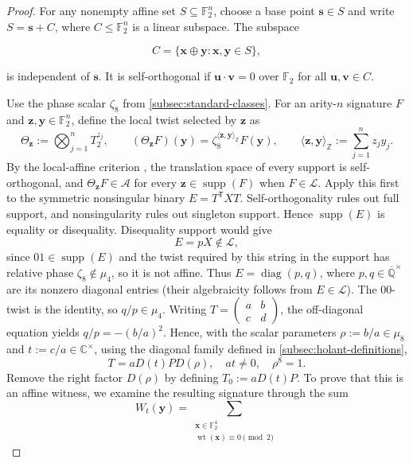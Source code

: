 \documentclass[11pt,letterpaper,onecolumn]{article}
\theoremstyle{plain}
\theoremstyle{definition}
\theoremstyle{remark}
\newcommand{\AlgNums}{\overline{\mathbb Q}}
\newcommand{\Ftwo}{\mathbb F_2}
\newcommand{\cA}{\mathscr A}
\newcommand{\cL}{\mathscr L}
\newcommand{\diag}{\operatorname{diag}}
\newcommand{\wt}{\operatorname{wt}}
\newcommand{\supp}{\operatorname{supp}}
\begin{document}
\begin{proof}
For any nonempty affine set \(S\subseteq\Ftwo^n\), choose a base point
\({\mathbf{s}}\in S\) and write \(S={\mathbf{s}}+C\), where \(C\leq\Ftwo^n\) is a linear subspace.  The subspace

\[
  C=\{{\mathbf{x}}\oplus {\mathbf{y}}:{\mathbf{x}},{\mathbf{y}}\in S\},
\]

is independent of \({\mathbf{s}}\).  It is self-orthogonal if
\({\mathbf{u}}\mathbin{\cdot}{\mathbf{v}}=0\) over \(\Ftwo\) for all \({\mathbf{u}},{\mathbf{v}}\in C\).

Use the phase scalar \(\zeta_8\) from \cref{subsec:standard-classes}.  For an arity-\(n\) signature
\(F\) and \({\mathbf{z}},{\mathbf{y}}\in\Ftwo^n\), define the local twist selected by \({\mathbf{z}}\) as
\[
  \Theta_{\mathbf{z}}:=\bigotimes_{j=1}^nT_2^{z_j},
  \qquad
  (\Theta_{\mathbf{z}}F)({\mathbf{y}})
  =\zeta_8^{\langle {\mathbf{z}},{\mathbf{y}}\rangle_{\mathbb Z}}F({\mathbf{y}}),
  \qquad
  \langle {\mathbf{z}},{\mathbf{y}}\rangle_{\mathbb Z}:=\sum_{j=1}^n z_jy_j.
\]
By the local-affine criterion
\cite[Definition~3.1 and Theorem~3.2]{CaiLuXia2018RealHolantc}, the
translation space of every support is self-orthogonal, and
\(\Theta_{\mathbf{z}}F\in\cA\) for every \({\mathbf{z}}\in\supp(F)\) when \(F\in\cL\).  Apply
this first to
the symmetric nonsingular binary \(E=T^{\mathsf T}XT\).  Self-orthogonality
rules
out full support, and nonsingularity rules out singleton support. Hence
\(\supp(E)\) is equality or disequality.  Disequality support would give
\[
  E=pX\notin\cL,
\]
since \(01\in\supp(E)\) and the twist required by this string in the support has
relative phase \(\zeta_8\notin\mu_4\), so it is not affine.  Thus
\(E=\diag(p,q)\), where \(p,q\in\AlgNums^\times\) are its nonzero diagonal
entries (their algebraicity follows from \(E\in\cL\)). The \(00\)-twist is
the identity, so
\(q/p\in\mu_4\).  Writing
\(T=(\begin{smallmatrix}a&b\\c&d\end{smallmatrix})\), the off-diagonal
equation yields \(q/p=-(b/a)^2\).  Hence, with the scalar parameters
\(\rho:=b/a\in\mu_8\) and \(t:=c/a\in\mathbb C^\times\), using the diagonal family defined in
\cref{subsec:holant-definitions},
\[
  T=aD(t)PD(\rho),
  \quad at\ne0,\quad \rho^8=1.
\]
Remove the right factor \(D(\rho)\) by defining \(T_0:=aD(t)P\).
To prove that this is an affine witness, we examine the resulting
signature through the sum
\[
  W_t({\mathbf{y}})=
  \sum_{\substack{{\mathbf{x}}\in\Ftwo^4\\\wt({\mathbf{x}})\equiv0\pmod 2}}
\]
\end{proof}
\end{document}
